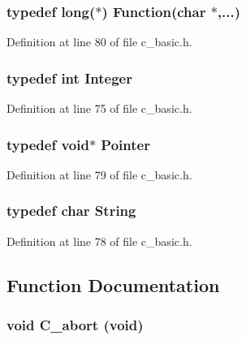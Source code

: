 \subsubsection{\setlength{\rightskip}{0pt plus 5cm}typedef long($\ast$) \bf{Function}(char $\ast$,...)}\label{c__basic_8h_869cf74ff597bed9fe389d50ada2e7e4}




Definition at line 80 of file c\_\-basic.h.
\subsubsection{\setlength{\rightskip}{0pt plus 5cm}typedef int \bf{Integer}}\label{c__basic_8h_fe9f289f12a5291891b470bd2bc3fca2}




Definition at line 75 of file c\_\-basic.h.
\subsubsection{\setlength{\rightskip}{0pt plus 5cm}typedef void$\ast$ \bf{Pointer}}\label{c__basic_8h_e274f9e1a208e72b8f1f67e6d23bf4ff}




Definition at line 79 of file c\_\-basic.h.
\subsubsection{\setlength{\rightskip}{0pt plus 5cm}typedef char \bf{String}}\label{c__basic_8h_44c275ba600ff58f519564714fc37466}




Definition at line 78 of file c\_\-basic.h.

\subsection{Function Documentation}
\subsubsection{\setlength{\rightskip}{0pt plus 5cm}void C\_\-abort (void)}\label{c__basic_8h_444d03c8c0836229e6050011309e10d5}




